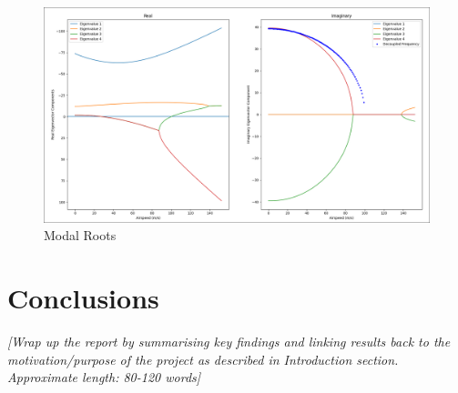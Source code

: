 \documentclass[11pt]{article}
\begin{document}
\begin{figure}
  \centering
  \includegraphics[width=170mm]{modal_roots.png}
  \caption{Modal Roots}\label{fig:modal_roots}
\end{figure}

\section*{Conclusions}\label{sec:conclusion}
\textcolor[rgb]{0.80,0.29,0.09}{\textsl{[Wrap up the report by summarising key findings and linking results back to the motivation/purpose of the project as described in Introduction section. Approximate length: 80-120 words]}}


{}

\end{document}
